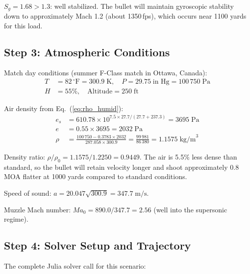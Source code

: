 \documentclass[11pt,twoside,openright]{report}
\newcommand{\Mach}{\mathit{Ma}}
\newcommand{\degF}{{}^{\circ}\mathrm{F}}
\begin{document}
$S_g = 1.68 > 1.3$: well stabilized. The bullet will maintain gyroscopic stability down to approximately Mach 1.2 (about 1350\,fps), which occurs near 1100 yards for this load.

\subsection{Step 3: Atmospheric Conditions}

Match day conditions (summer F-Class match in Ottawa, Canada):
\begin{align*}
  T &= 82\,\degF = 300.9\;\text{K}, \quad P = 29.75\;\text{in Hg} = 100\,750\;\text{Pa} \\
  H &= 55\%, \quad \text{Altitude} = 250\;\text{ft}
\end{align*}

Air density from Eq.~(\ref{eq:rho_humid}):
\begin{align*}
  e_s &= 610.78 \times 10^{7.5 \times 27.7 / (27.7 + 237.3)} = 3695\;\text{Pa} \\
  e &= 0.55 \times 3695 = 2032\;\text{Pa} \\
  \rho &= \frac{100\,750 - 0.3783 \times 2032}{287.058 \times 300.9} = \frac{99\,981}{86\,380} = 1.1575\;\text{kg/m}^3
\end{align*}

Density ratio: $\rho/\rho_0 = 1.1575/1.2250 = 0.9449$. The air is 5.5\% less dense than standard, so the bullet will retain velocity longer and shoot approximately 0.8 MOA flatter at 1000 yards compared to standard conditions.

Speed of sound: $a = 20.047\sqrt{300.9} = 347.7\;\text{m/s}$.

Muzzle Mach number: $\Mach_0 = 890.0/347.7 = 2.56$ (well into the supersonic regime).

\subsection{Step 4: Solver Setup and Trajectory}

The complete Julia solver call for this scenario:
\end{document}
